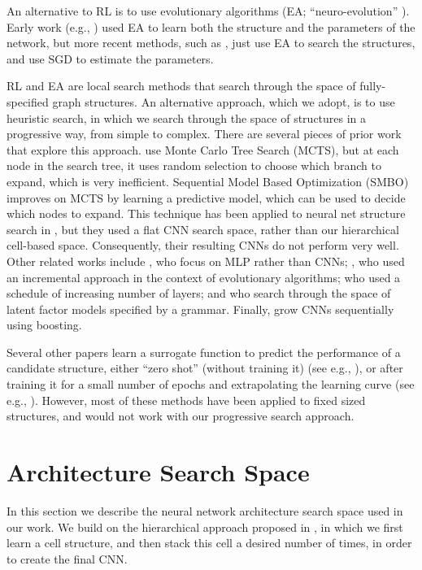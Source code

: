 \documentclass[runningheads]{llncs}
\begin{document}
An alternative  to RL is to use evolutionary algorithms (EA; ``neuro-evolution'' \cite{Stanley2017}).
Early work
(e.g., \cite{Stanley2002})
used EA to learn both the structure and the parameters of the network,
but more recent methods,
such as \cite{DBLP:conf/icml/RealMSSSTLK17,Miikkulainen2017,DBLP:journals/corr/XieY17,Liu2017,DBLP:journals/corr/abs-1802-01548},
just use EA to search the structures, and use SGD to estimate the parameters.

RL and EA are local search methods that search through the space of fully-specified graph structures. An alternative approach, which we adopt, is to use heuristic search, in which we search through the space of structures in a progressive way, from simple to complex.
There are several pieces of prior work that explore this approach.
\cite{Negrinho2017} use Monte Carlo Tree Search (MCTS),
but at each node in the search tree, it uses random selection to choose which branch to expand,
which is very inefficient.
Sequential Model Based Optimization (SMBO) \cite{Hutter2011} improves on MCTS by learning a predictive model, which can be used to decide which nodes to expand.
This technique has been applied to neural net structure search in
\cite{Negrinho2017},
but they used a flat CNN search space, rather than our hierarchical cell-based space.
Consequently, their resulting CNNs do not perform very well.
Other related works include
\cite{Mendoza2016}, who focus on MLP rather than CNNs;
\cite{Stanley2002}, who used an incremental approach in the context of evolutionary algorithms; \cite{DBLP:journals/corr/ZophL16} who used a schedule of increasing number of layers;
and \cite{Grosse2012} who 
search through the space of latent factor models specified by a grammar.
Finally, \cite{Cortes2016,Huang2017boosting} grow CNNs sequentially using boosting.


Several other papers learn a surrogate function to predict the performance of a candidate structure, either ``zero shot'' (without training it)
(see e.g., \cite{SMASH}),
or after training it for a small number of epochs and extrapolating the learning curve
(see e.g.,  \cite{Domhan2015,Baker2017acc}).
However, most of these methods have been applied to fixed sized structures, and would not work with our progressive search approach.


\section{Architecture Search Space}\label{sec:search}\label{sec:space}In this section we describe the neural network architecture search space used in our work.
We build on the hierarchical approach
proposed in  \cite{DBLP:journals/corr/ZophVSL17},
in which we first learn a cell structure, and then stack this cell a desired number of times,
in order to create the final CNN.
\end{document}
